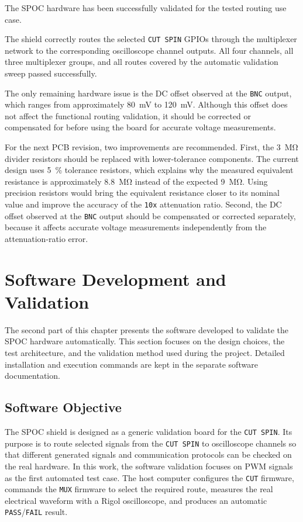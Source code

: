 The SPOC hardware has been successfully validated for the tested routing
use case.

The shield correctly routes the selected \texttt{CUT SPIN} GPIOs through
the multiplexer network to the corresponding oscilloscope channel
outputs. All four channels, all three multiplexer groups, and all routes
covered by the automatic validation sweep passed successfully.

The only remaining hardware issue is the DC offset observed at the
\texttt{BNC} output, which ranges from approximately
\SI{80}{\milli\volt} to \SI{120}{\milli\volt}. Although this offset does not affect
the functional routing validation, it should be corrected or compensated
for before using the board for accurate voltage measurements.

For the next PCB revision, two improvements are recommended. First, the
\SI{3}{\mega\ohm} divider resistors should be replaced with
lower-tolerance components. The current design uses \SI{5}{\percent}
tolerance resistors, which explains why the measured equivalent
resistance is approximately \SI{8.8}{\mega\ohm} instead of the expected
\SI{9}{\mega\ohm}. Using precision resistors would bring the equivalent
resistance closer to its nominal value and improve the accuracy of the
\texttt{10x} attenuation ratio. Second, the DC offset observed at the
\texttt{BNC} output should be compensated or corrected separately,
because it affects accurate voltage measurements independently from the
attenuation-ratio error.

\FloatBarrier


\section{Software Development and Validation}
\label{software-development-and-validation}

The second part of this chapter presents the software developed to
validate the SPOC hardware automatically. This section focuses on the
design choices, the test architecture, and the validation method used
during the project. Detailed installation and execution commands are
kept in the separate software documentation.

\subsection{Software Objective}
\label{software-objective}

The SPOC shield is designed as a generic validation board for the
\texttt{CUT SPIN}. Its purpose is to route selected signals from the
\texttt{CUT SPIN} to oscilloscope channels so that different generated
signals and communication protocols can be checked on the real hardware.
In this work, the software validation focuses on PWM signals as the
first automated test case. The host computer configures the
\texttt{CUT} firmware, commands the \texttt{MUX} firmware to select the
required route, measures the real electrical waveform with a Rigol
oscilloscope, and produces an automatic \texttt{PASS}/\texttt{FAIL}
result.

